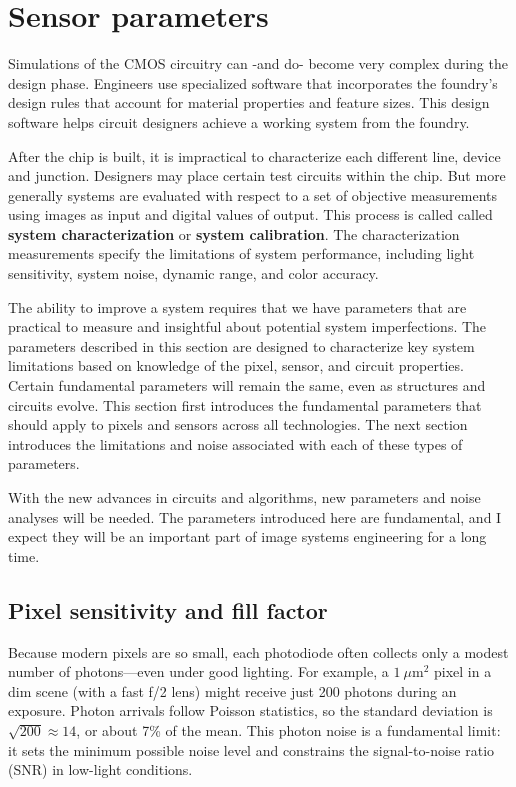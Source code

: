 \documentclass[
  letterpaper,
]{book}
\begin{document}
\chapter{Sensor parameters}\label{sec-system-parameters}

Simulations of the CMOS circuitry can -and do- become very complex
during the design phase. Engineers use specialized software that
incorporates the foundry's design rules that account for material
properties and feature sizes. This design software helps circuit
designers achieve a working system from the foundry.

After the chip is built, it is impractical to characterize each
different line, device and junction. Designers may place certain test
circuits within the chip. But more generally systems are evaluated with
respect to a set of objective measurements using images as input and
digital values of output. This process is called called \textbf{system
characterization} or \textbf{system calibration}. The characterization
measurements specify the limitations of system performance, including
light sensitivity, system noise, dynamic range, and color accuracy.

The ability to improve a system requires that we have parameters that
are practical to measure and insightful about potential system
imperfections. The parameters described in this section are designed to
characterize key system limitations based on knowledge of the pixel,
sensor, and circuit properties. Certain fundamental parameters will
remain the same, even as structures and circuits evolve. This section
first introduces the fundamental parameters that should apply to pixels
and sensors across all technologies. The next section introduces the
limitations and noise associated with each of these types of parameters.

With the new advances in circuits and algorithms, new parameters and
noise analyses will be needed. The parameters introduced here are
fundamental, and I expect they will be an important part of image
systems engineering for a long time.

\section{Pixel sensitivity and fill
factor}\label{sec-pixel-sensitivity-fillfactor}

Because modern pixels are so small, each photodiode often collects only
a modest number of photons---even under good lighting. For example, a
\(1~\mu\text{m}^2\) pixel in a dim scene (with a fast f/2 lens) might
receive just 200 photons during an exposure. Photon arrivals follow
Poisson statistics, so the standard deviation is
\(\sqrt{200} \approx 14\), or about 7\% of the mean. This photon noise
is a fundamental limit: it sets the minimum possible noise level and
constrains the signal-to-noise ratio (SNR) in low-light conditions.
\end{document}
